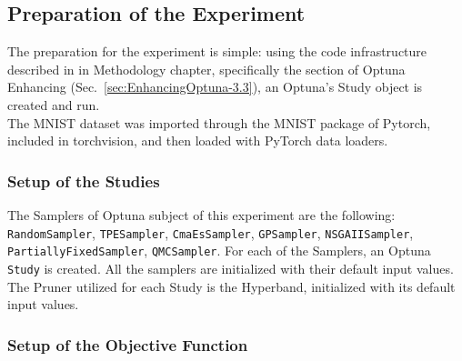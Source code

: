 % 
% 
% 

\subsection{Preparation of the Experiment}

The preparation for the experiment is simple: using the code infrastructure described in in Methodology chapter, specifically the section of Optuna Enhancing (Sec.~\ref{sec:EnhancingOptuna-3.3}), an Optuna's Study object is created and run.
\\[0.3cm]The MNIST dataset was imported through the MNIST package of Pytorch, included in torchvision, and then loaded with PyTorch data loaders.

\subsubsection{Setup of the Studies}

The Samplers of Optuna subject of this experiment are the following: \texttt{RandomSampler}, \texttt{TPESampler}, \texttt{CmaEsSampler}, \texttt{GPSampler}, \texttt{NSGAIISampler}, \texttt{PartiallyFixedSampler}, \texttt{QMCSampler}.
For each of the Samplers, an Optuna \texttt{Study} is created. All the samplers are initialized with their default input values.
\\[0.3cm]The Pruner utilized for each Study is the Hyperband, initialized with its default input values.

\subsubsection{Setup of the Objective Function}

